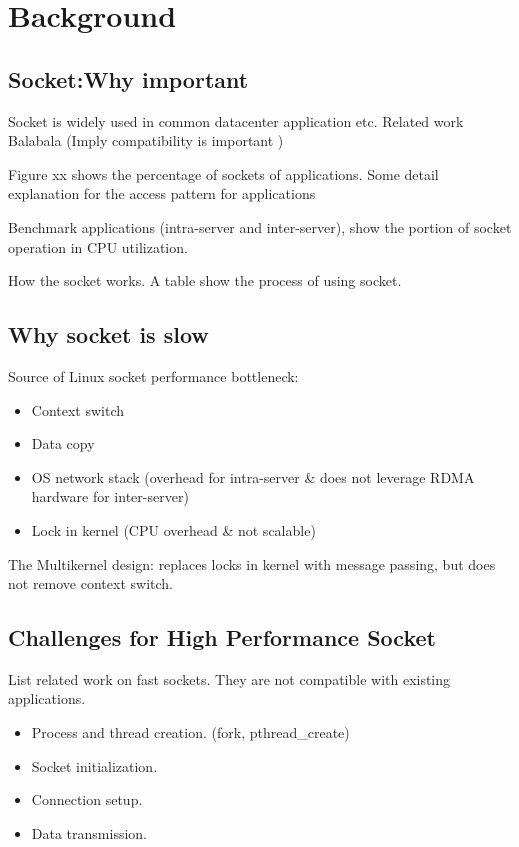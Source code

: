 \section{Background}
\label{sec:background}

\subsection{Socket:Why important}

Socket is widely used in common datacenter application etc. Related work Balabala (Imply compatibility is important )

Figure xx shows the percentage of sockets of applications. Some detail explanation for the access pattern for applications

Benchmark applications (intra-server and inter-server), show the portion of socket operation in CPU utilization.

How the socket works. A table show the process of using socket.

\subsection{Why socket is slow}
Source of Linux socket performance bottleneck:
\begin{itemize}
	\item Context switch
	\item Data copy
	\item OS network stack (overhead for intra-server \& does not leverage RDMA hardware for inter-server)
	\item Lock in kernel (CPU overhead \& not scalable)
\end{itemize}

The Multikernel design: replaces locks in kernel with message passing, but does not remove context switch.

\subsection{Challenges for High Performance Socket}

List related work on fast sockets. They are not compatible with existing applications.

\begin{itemize}
	\item Process and thread creation. (fork, pthread\_create)
	\item Socket initialization.
	\item Connection setup.
	\item Data transmission.
\end{itemize}

